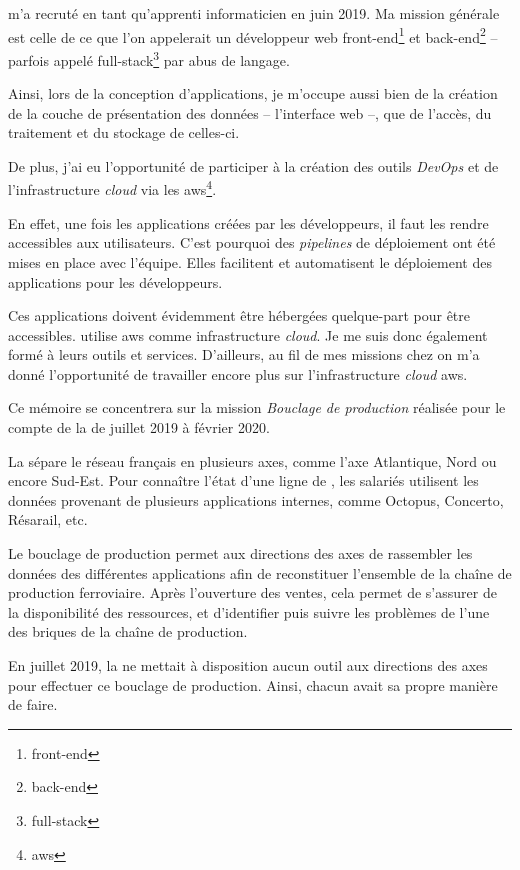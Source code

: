 \entreprise m'a recruté en tant qu'apprenti informaticien en juin 2019.
Ma mission générale est celle de ce que l'on appelerait un développeur web 
\gls{front-end}\footnote{\glsdesc{front-end}}
et 
\gls{back-end}\footnote{\glsdesc{back-end}} 
-- parfois appelé 
\gls{full-stack}\footnote{\glsdesc{full-stack}}
par abus de langage.

Ainsi, lors de la conception d'applications, je m'occupe aussi bien de la création de la couche de présentation des données -- l'interface web --, que de l'accès, du traitement et du stockage de celles-ci.

De plus, j'ai eu l'opportunité de participer à la création des outils \textit{DevOps} et de l'infrastructure \textit{cloud} via les
\gls{aws}\footnote{\glsdesc{aws}}.

En effet, une fois les applications créées par les développeurs, il faut les rendre accessibles aux utilisateurs. C'est pourquoi des \textit{pipelines} de déploiement ont été mises en place avec l'équipe. Elles facilitent et automatisent le déploiement des applications pour les développeurs.

Ces applications doivent évidemment être hébergées quelque-part pour être accessibles. \entreprise utilise \gls{aws} comme infrastructure \textit{cloud}. Je me suis donc également formé à leurs outils et services. D'ailleurs, au fil de mes missions chez \entreprise on m'a donné l'opportunité de travailler encore plus sur l'infrastructure \textit{cloud} \gls{aws}.

\newpage{}

Ce mémoire se concentrera sur la mission \emph{Bouclage de production} réalisée pour le compte de la \sncf de juillet 2019 à février 2020.

La \sncf sépare le réseau \tgv français en plusieurs axes, comme l'axe Atlantique, Nord ou encore Sud-Est.
Pour connaître l'état d'une ligne de \tgv, les salariés utilisent les données provenant de plusieurs applications internes, comme Octopus, Concerto, Résarail, etc.

Le \og bouclage de production \fg permet aux directions des axes de rassembler les données des différentes applications afin de reconstituer l'ensemble de la chaîne de production ferroviaire.
Après l'ouverture des ventes, cela permet de s'assurer de la disponibilité des ressources, et d'identifier puis suivre les problèmes de l'une des briques de la chaîne de production.

En juillet 2019, la \sncf ne mettait à disposition aucun outil aux directions des axes pour effectuer ce bouclage de production. Ainsi, chacun avait sa propre manière de faire.

